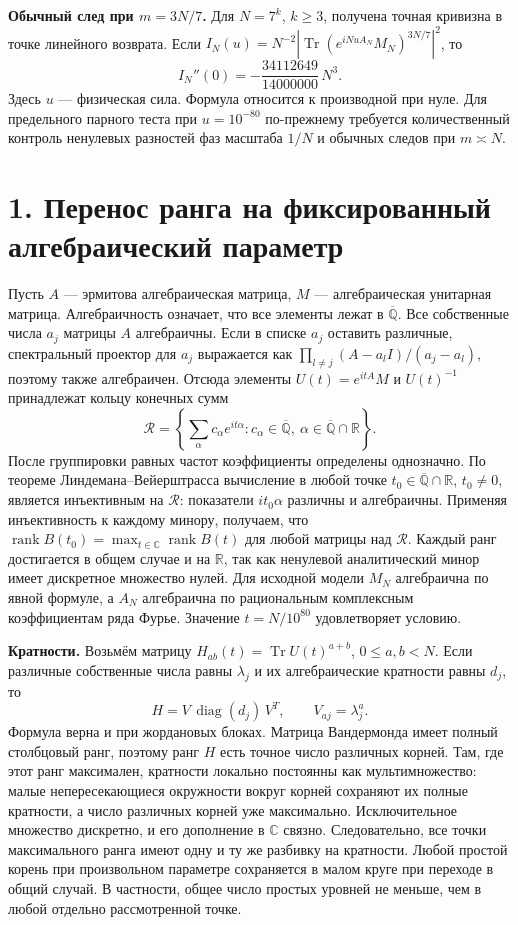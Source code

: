 \documentclass[11pt,a4paper]{article}
\newcommand{\Tr}{\operatorname{Tr}}
\newcommand{\R}{\mathbb R}
\newcommand{\C}{\mathbb C}
\newcommand{\sect}[1]{\section*{\sffamily\color{ink}#1}}
\newcommand{\subt}[1]{\par\medskip\noindent\textbf{#1.}\quad}
\newcommand{\kk}{\overline{\mathbb Q}}
\newcommand{\diag}{\operatorname{diag}}
\begin{document}
\textbf{Обычный след при \(m=3N/7\).} Для \(N=7^k\), \(k\ge3\), получена точная кривизна в точке линейного возврата. Если \(I_N(u)=N^{-2}|\Tr(e^{iNu A_N}M_N)^{3N/7}|^2\), то
\[
               I_N''(0)=-\frac{34112649}{14000000}\,N^3 .
\]
Здесь \(u\) --- физическая сила. Формула относится к производной при нуле. Для предельного парного теста при \(u=10^{-80}\) по-прежнему требуется количественный контроль ненулевых разностей фаз масштаба \(1/N\) и обычных следов при \(m\asymp N\).
\newpage
\sect{1. Перенос ранга на фиксированный алгебраический параметр}
Пусть \(A\) --- эрмитова алгебраическая матрица, \(M\) --- алгебраическая унитарная матрица. Алгебраичность означает, что все элементы лежат в \(\kk\). Все собственные числа \(a_j\) матрицы \(A\) алгебраичны. Если в списке \(a_j\) оставить различные, спектральный проектор для \(a_j\) выражается как \(\prod_{l\ne j}(A-a_l I)/(a_j-a_l)\), поэтому также алгебраичен. Отсюда элементы \(U(t)=e^{itA}M\) и \(U(t)^{-1}\) принадлежат кольцу конечных сумм
\[
 \mathcal R=\left\{\sum_{\alpha}c_\alpha e^{it\alpha} :
              c_\alpha\in\kk,\ \alpha\in\kk\cap\R\right\}.
\]
После группировки равных частот коэффициенты определены однозначно. По теореме Линдемана--Вейерштрасса вычисление в любой точке \(t_0\in\kk\cap\R\), \(t_0\ne0\), является инъективным на \(\mathcal R\): показатели \(it_0\alpha\) различны и алгебраичны. Применяя инъективность к каждому минору, получаем, что \(\operatorname{rank}B(t_0)=\max_{t\in\C}\operatorname{rank}B(t)\) для любой матрицы над \(\mathcal R\). Каждый ранг достигается в общем случае и на \(\R\), так как ненулевой аналитический минор имеет дискретное множество нулей. Для исходной модели \(M_N\) алгебраична по явной формуле, а \(A_N\) алгебраична по рациональным комплексным коэффициентам ряда Фурье. Значение \(t=N/10^{80}\) удовлетворяет условию.

\subt{Кратности}
Возьмём матрицу \(H_{ab}(t)=\Tr U(t)^{a+b}\), \(0\le a,b<N\). Если различные собственные числа равны \(\lambda_j\) и их алгебраические кратности равны \(d_j\), то
\[
                       H=V\,\diag(d_j)\,V^T,\qquad V_{aj}=\lambda_j^a.
\]
Формула верна и при жордановых блоках. Матрица Вандермонда имеет полный столбцовый ранг, поэтому ранг \(H\) есть точное число различных корней. Там, где этот ранг максимален, кратности локально постоянны как мультимножество: малые непересекающиеся окружности вокруг корней сохраняют их полные кратности, а число различных корней уже максимально. Исключительное множество дискретно, и его дополнение в \(\C\) связно. Следовательно, все точки максимального ранга имеют одну и ту же разбивку на кратности. Любой простой корень при произвольном параметре сохраняется в малом круге при переходе в общий случай. В частности, общее число простых уровней не меньше, чем в любой отдельно рассмотренной точке.
\end{document}
